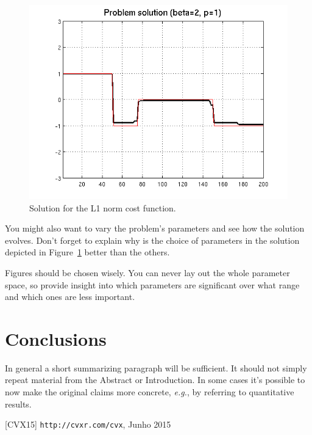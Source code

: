\documentclass[a4paper]{IEEEtran}
\begin{document}
\begin{figure}[htp]
  \centering
  \includegraphics[width=0.9\columnwidth]{./solution1}
  \caption{Solution for the L1 norm cost function.}
  \label{fig:solution-l1}
\end{figure}

You might also want to vary the problem's parameters and see how the
solution evolves. Don't forget to explain why is the choice of
parameters in the solution depicted in Figure~\ref{fig:solution-l1}
better than the others.

Figures should be chosen wisely. You can never lay out the whole
parameter space, so provide insight into which parameters are
significant over what range and which ones are less important.



\section{Conclusions}
\label{sec:conclusion}

In general a short summarizing paragraph will be sufficient. It should
not simply repeat material from the Abstract or Introduction. In some
cases it's possible to now make the original claims more concrete,
\textit{e.g.}, by referring to quantitative results.


\begin{thebibliography}{9}

  [CVX15] \texttt{http://cvxr.com/cvx}, Junho 2015

\end{thebibliography}
\end{document}
